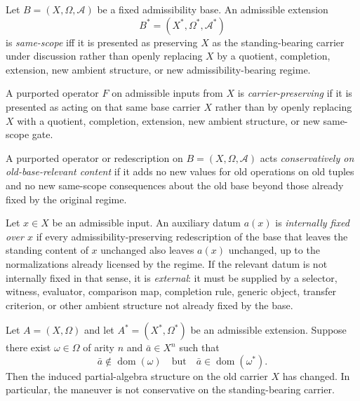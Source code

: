 \begin{definition}
Let $B=(X,\Omega,\mathcal A)$ be a fixed admissibility base. An admissible extension
\[
B^{\ast}=(X^{\ast},\Omega^{\ast},\mathcal A^{\ast})
\]
is \emph{same-scope} iff it is presented as preserving $X$ as the standing-bearing carrier under discussion rather than openly replacing $X$ by a quotient, completion, extension, new ambient structure, or new admissibility-bearing regime.
\end{definition}

\begin{definition}
A purported operator $F$ on admissible inputs from $X$ is \emph{carrier-preserving} if it is presented as acting on that same base carrier $X$ rather than by openly replacing $X$ with a quotient, completion, extension, new ambient structure, or new same-scope gate.
\end{definition}

\begin{definition}
A purported operator or redescription on $B=(X,\Omega,\mathcal A)$ acts \emph{conservatively on old-base-relevant content} if it adds no new values for old operations on old tuples and no new same-scope consequences about the old base beyond those already fixed by the original regime.
\end{definition}

\begin{definition}
Let $x\in X$ be an admissible input. An auxiliary datum $a(x)$ is \emph{internally fixed over $x$} if every admissibility-preserving redescription of the base that leaves the standing content of $x$ unchanged also leaves $a(x)$ unchanged, up to the normalizations already licensed by the regime. If the relevant datum is not internally fixed in that sense, it is \emph{external}: it must be supplied by a selector, witness, evaluator, comparison map, completion rule, generic object, transfer criterion, or other ambient structure not already fixed by the base.
\end{definition}

\begin{lemma}
\label{lem:old-graph-change-nonconservative}
Let $A=(X,\Omega)$ and let $A^{\ast}=(X^{\ast},\Omega^{\ast})$ be an admissible extension. Suppose there exist $\omega\in\Omega$ of arity $n$ and $\bar a\in X^n$ such that
\[
\bar a\notin\operatorname{dom}(\omega)\quad\text{but}\quad \bar a\in\operatorname{dom}(\omega^{\ast}).
\]
Then the induced partial-algebra structure on the old carrier $X$ has changed. In particular, the maneuver is not conservative on the standing-bearing carrier.
\end{lemma}

